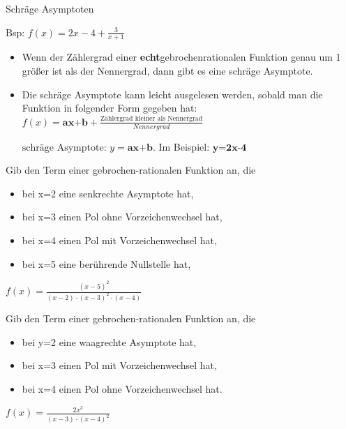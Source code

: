 \documentclass[paper=a6,landscape,ngerman,twoside=true,fontsize=12pt]{scrartcl}
\begin{document}
\begin{frage}
	Schräge Asymptoten \bigskip
	
	Bsp: $f(x)=2x -4 +\frac{3}{x+1}$
\end{frage}
\begin{antwort}
	\begin{itemize} 
		\item \large Wenn der Zählergrad einer \textbf{echt}gebrochenrationalen Funktion genau um 1 größer ist als der Nennergrad, dann gibt es eine schräge Asymptote.		
		
		\item Die schräge Asymptote kann leicht ausgelesen werden, sobald man die Funktion in folgender Form gegeben hat: $f(x)=\textbf{ax+b} +\frac{\text{Zählergrad kleiner als Nennergrad}}{Nennergrad}$ 
		
		$\text{schräge Asymptote: } y=\textbf{ax+b}.$	Im Beispiel: $\textbf {y=2x-4}$
	\end{itemize} 
\end{antwort}
\begin{frage}
	\LARGE Gib den Term einer gebrochen-rationalen Funktion an, die
	\begin{itemize} \large
		\item bei x=2 eine senkrechte Asymptote hat,		
		\item bei x=3 einen Pol ohne Vorzeichenwechsel hat, 
		\item bei x=4 einen Pol mit Vorzeichenwechsel hat,
		\item bei x=5 eine berührende Nullstelle hat,			
	\end{itemize} 
\end{frage}
\begin{antwort}
	\LARGE $f(x)=\frac{ (x-5)^2 }{(x-2) \cdot (x-3)^2 \cdot (x-4)}$
\end{antwort}
\begin{frage}
	\LARGE Gib den Term einer gebrochen-rationalen Funktion an, die
	\begin{itemize} \large
		\item bei y=2 eine waagrechte Asymptote hat,		
		\item bei x=3 einen Pol mit Vorzeichenwechsel hat, 
		\item bei x=4 einen Pol ohne Vorzeichenwechsel hat.	
		
	\end{itemize} 
	
\end{frage}
\begin{antwort}
	\LARGE $f(x)=\frac{ 2x^3}{(x-3) \cdot (x-4)^2}$
\end{antwort}
\end{document}
